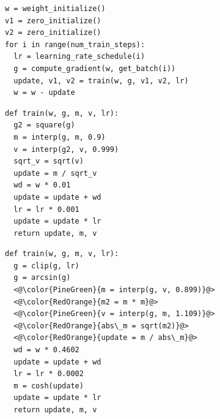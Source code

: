 \documentclass{article}
\newcommand{\name}{Lion}
\begin{document}


\begin{figure}
\begin{minipage}[t]{.39\linewidth}
\begin{lstlisting}[caption={An example training loop, where the optimization algorithm that we are searching for is encoded within the \texttt{train} function. The main inputs are the weight (\texttt{w}), gradient (\texttt{g}) and learning rate schedule (\texttt{lr}). The main output is the \texttt{update} to the weight. \texttt{v1} and \texttt{v2} are two additional variables for collecting historical information.}, captionpos=t, label={loop}]
w = weight_initialize()
v1 = zero_initialize()
v2 = zero_initialize()
for i in range(num_train_steps):
  lr = learning_rate_schedule(i)
  g = compute_gradient(w, get_batch(i))
  update, v1, v2 = train(w, g, v1, v2, lr)
  w = w - update
\end{lstlisting}
\end{minipage}\hspace{19pt}%
\begin{minipage}[t]{.25\linewidth}
\begin{lstlisting}[caption={Initial program (AdamW). The bias correction and $\epsilon$ are omitted for simplicity.}, captionpos=t, label={lst:p1}]
def train(w, g, m, v, lr):
  g2 = square(g)
  m = interp(g, m, 0.9)
  v = interp(g2, v, 0.999)
  sqrt_v = sqrt(v)
  update = m / sqrt_v
  wd = w * 0.01
  update = update + wd
  lr = lr * 0.001
  update = update * lr
  return update, m, v
\end{lstlisting}
\end{minipage}\hspace{19pt}%
\begin{minipage}[t]{.28\linewidth}
\begin{lstlisting}[caption={Discovered program after search, selection and removing redundancies in the raw Program~\ref{lst:raw}. Some variables are renamed for clarity.}, captionpos=t, label={lst:p2}]
def train(w, g, m, v, lr):
  g = clip(g, lr)
  g = arcsin(g)
  <@\color{PineGreen}{m = interp(g, v, 0.899)}@>
  <@\color{RedOrange}{m2 = m * m}@>
  <@\color{PineGreen}{v = interp(g, m, 1.109)}@>
  <@\color{RedOrange}{abs\_m = sqrt(m2)}@>
  <@\color{RedOrange}{update = m / abs\_m}@>
  wd = w * 0.4602
  update = update + wd
  lr = lr * 0.0002
  m = cosh(update)
  update = update * lr
  return update, m, v
\end{lstlisting}
\end{minipage}
\vspace{-10pt}
\end{figure}
\end{document}
